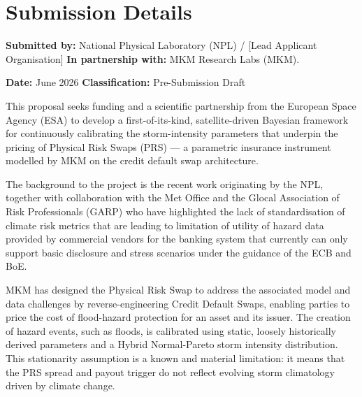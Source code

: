 \documentclass[11pt,a4paper]{article}
\begin{document}
\mkmtitlepage
\mkmlegalpage
\tableofcontents
\clearpage

\section*{Submission Details}

\noindent\textbf{Submitted by:} National Physical Laboratory (NPL) / [Lead
Applicant Organisation] \textbf{In partnership with:} MKM Research Labs (MKM).

\vspace{0.5em}
\noindent\textbf{Date:} June 2026 \hfill \textbf{Classification:} Pre-Submission
Draft

\mkmexecsummary

This proposal seeks funding and a scientific partnership from the European Space
Agency (ESA) to develop a first-of-its-kind, satellite-driven Bayesian framework
for continuously calibrating the storm-intensity parameters that underpin the
pricing of Physical Risk Swaps (PRS) --- a parametric insurance instrument
modelled by MKM on the credit default swap architecture.

The background to the project is the recent work originating by the NPL, together
with collaboration with the Met Office and the Glocal Association of Risk
Professionals (GARP) who have highlighted the lack of standardisation of climate
risk metrics that are leading to limitation of utility of hazard data provided by
commercial vendors for the banking system that currently can only support basic
disclosure and stress scenarios under the guidance of the ECB and BoE.

MKM has designed the Physical Risk Swap to address the associated model and data
challenges by reverse-engineering Credit Default Swaps, enabling parties to price
the cost of flood-hazard protection for an asset and its issuer. The creation of
hazard events, such as floods, is calibrated using static, loosely historically
derived parameters and a Hybrid Normal-Pareto storm intensity distribution. This
stationarity assumption is a known and material limitation: it means that the PRS
spread and payout trigger do not reflect evolving storm climatology driven by
climate change.
\end{document}
